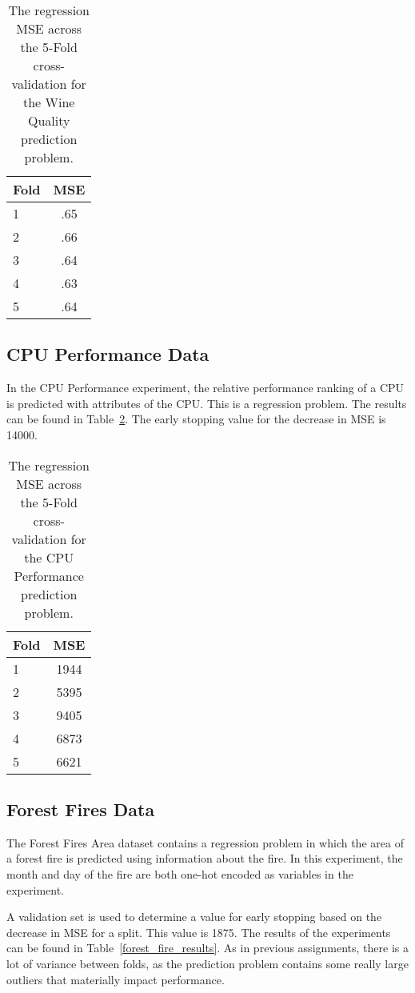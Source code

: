 \documentclass{amsart}
\begin{document}
    \begin{table}[H]
    \begin{tabular}{lc}
        Fold & MSE \\
        \hline
        1 & .65 \\
        2 & .66 \\
        3 & .64 \\
        4 & .63 \\
        5 & .64
    \end{tabular}
    \label{wine_results}
    \caption{The regression MSE across the 5-Fold cross-validation for the
    Wine Quality prediction problem.}
    \end{table}


    \subsection{CPU Performance Data}
    In the CPU Performance experiment\cite{cpu_dataset}, the relative performance
    ranking of a CPU is predicted with attributes of the CPU. This is a
    regression problem. The results can be found in Table~\ref{cpu_results}.
    The early stopping value for the decrease in
    MSE is 14000.


    \begin{table}[H]
    \begin{tabular}{lc}
        Fold & MSE \\
        \hline
        1 & 1944 \\
        2 & 5395 \\
        3 & 9405 \\
        4 & 6873 \\
        5 & 6621
    \end{tabular}
    \label{cpu_results}
    \caption{The regression MSE  across the 5-Fold cross-validation for the
    CPU Performance prediction problem.}
    \end{table}

    \subsection{Forest Fires Data}
    The Forest Fires Area dataset\cite{ff_dataset} contains a regression problem
    in which the area of a forest fire is predicted using information
    about the fire.
    In this experiment, the month and day of the fire are both one-hot encoded
    as variables in the experiment.

    A validation set is used to determine a value for early stopping
    based on the decrease in MSE for a split. This value is 1875.
    The results of the experiments can be found in Table~\ref{forest_fire_results}.
    As in previous assignments, there is a lot of variance between folds, as the
    prediction problem contains some really large outliers that materially
    impact performance.
\end{document}

